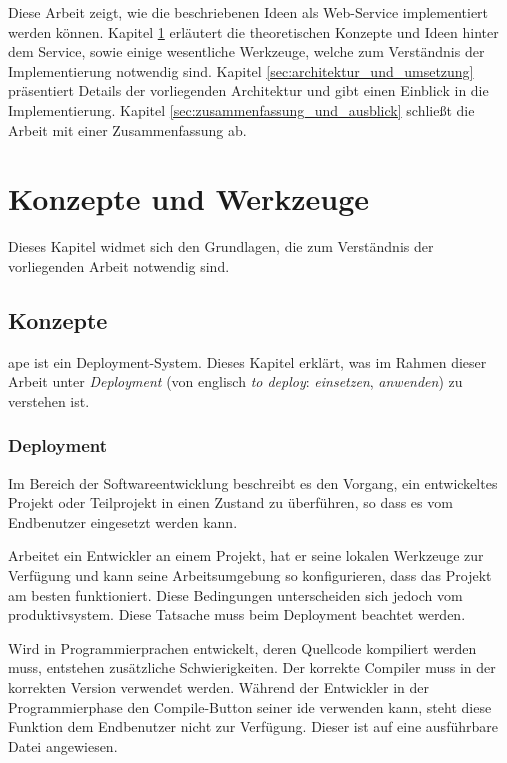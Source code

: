 Diese Arbeit zeigt, wie die beschriebenen Ideen als Web-Service implementiert werden können. Kapitel \ref{sec:konzepte_und_werkzeuge} erläutert die theoretischen Konzepte und Ideen hinter dem Service, sowie einige wesentliche Werkzeuge, welche zum Verständnis der Implementierung notwendig sind. Kapitel \ref{sec:architektur_und_umsetzung} präsentiert Details der vorliegenden Architektur und gibt einen Einblick in die Implementierung. Kapitel \ref{sec:zusammenfassung_und_ausblick} schließt die Arbeit mit einer Zusammenfassung ab.


\section{Konzepte und Werkzeuge} %
\label{sec:konzepte_und_werkzeuge}

Dieses Kapitel widmet sich den Grundlagen, die zum Verständnis der vorliegenden Arbeit notwendig sind.

\subsection{Konzepte} %
\label{sub:konzepte}

\gls{ape} ist ein Deployment-System. Dieses Kapitel erklärt, was im Rahmen dieser Arbeit unter \emph{Deployment} (von englisch \emph{to deploy}: \emph{einsetzen}, \emph{anwenden}) zu verstehen ist.

\subsubsection{Deployment} %
\label{ssub:deployment}

Im Bereich der Softwareentwicklung beschreibt es den Vorgang, ein entwickeltes Projekt oder Teilprojekt in einen Zustand zu überführen, so dass es vom Endbenutzer eingesetzt werden kann.

Arbeitet ein Entwickler an einem Projekt, hat er seine lokalen Werkzeuge zur Verfügung und kann seine Arbeitsumgebung so konfigurieren, dass das Projekt am besten funktioniert. Diese Bedingungen unterscheiden sich jedoch vom \gls{produktivsystem}. Diese Tatsache muss beim Deployment beachtet werden.

Wird in Programmierprachen entwickelt, deren Quellcode kompiliert werden muss, entstehen zusätzliche Schwierigkeiten. Der korrekte Compiler muss in der korrekten Version verwendet werden. Während der Entwickler in der Programmierphase den Compile-Button seiner \gls{ide} verwenden kann, steht diese Funktion dem Endbenutzer nicht zur Verfügung. Dieser ist auf eine ausführbare Datei angewiesen.

